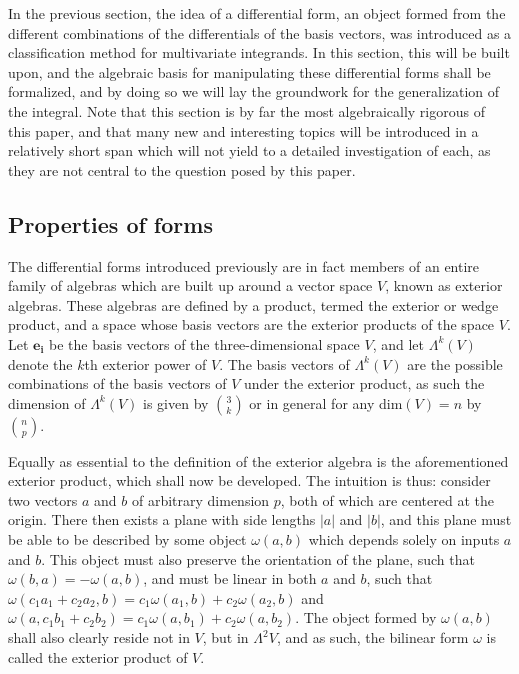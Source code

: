 \documentclass[.../main.tex]{subfiles}
\begin{document}
In the previous section, the idea of a differential form, an object formed from the different combinations of the differentials of the basis vectors, was introduced as a classification method for multivariate integrands. In this section, this will be built upon, and the algebraic basis for manipulating these differential forms shall be formalized, and by doing so we will lay the groundwork for the generalization of the integral. Note that this section is by far the most algebraically rigorous of this paper, and that many new and interesting topics will be introduced in a relatively short span which will not yield to a detailed investigation of each, as they are not central to the question posed by this paper.

\subsection{Properties of forms} \label{subsection: 3.1}
The differential forms introduced previously are in fact members of an entire family of algebras which are built up around a vector space $V$, known as exterior algebras. These algebras are defined by a product, termed the exterior or wedge product, and a space whose basis vectors are the exterior products of the space $V$. Let $\mathbf{e_i}$ be the basis vectors of the three-dimensional space $V$, and let $\Lambda^k(V)$ denote the $k$th exterior power of $V$. The basis vectors of $\Lambda^k(V)$ are the possible combinations of the basis vectors of $V$ under the exterior product, as such the dimension of $\Lambda^k(V)$ is given by ${3}\choose{k}$ or in general for any dim$(V) = n$ by ${n}\choose{p}$.

Equally as essential to the definition of the exterior algebra is the aforementioned exterior product, which shall now be developed. The intuition is thus: consider two vectors $a$ and $b$ of arbitrary dimension $p$, both of which are centered at the origin. There then exists a plane with side lengths $|a|$ and $|b|$, and this plane must be able to be described by some object $\omega(a, b)$ which depends solely on inputs $a$ and $b$. This object must also preserve the orientation of the plane, such that $\omega(b, a) = -\omega(a, b)$, and must be linear in both $a$ and $b$, such that $\omega(c_1a_1 + c_2a_2, b) = c_1\omega(a_1, b) +  c_2\omega(a_2, b)$ and $\omega(a, c_1b_1 + c_2b_2) = c_1\omega(a, b_1) +  c_2\omega(a, b_2)$\footnotemark. The object formed by $\omega(a, b)$ shall also clearly reside not in $V$, but in $\Lambda^2V$, and as such, the bilinear form $\omega$ is called the exterior product of $V$.
\end{document}
